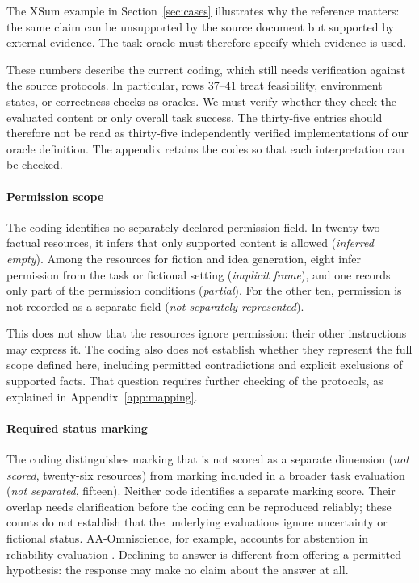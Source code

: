 \documentclass{clv2025}
\begin{document}
The XSum example in Section~\ref{sec:cases} illustrates why the reference
matters: the same claim can be unsupported by the source document but
supported by external evidence. The task oracle must therefore specify
which evidence is used.

These numbers describe the current coding, which still needs verification
against the source protocols. In particular, rows 37--41 treat feasibility,
environment states, or correctness checks as oracles. We must verify whether
they check the evaluated content or only overall task success. The
thirty-five entries should therefore not be read as thirty-five independently
verified implementations of our oracle definition. The appendix retains the
codes so that each interpretation can be checked.

\paragraph{Permission scope}
The coding identifies no separately declared permission field. In twenty-two
factual resources, it infers that only supported content is allowed
(\emph{inferred empty}). Among the resources for fiction and idea generation,
eight infer permission from the task or fictional setting
(\emph{implicit frame}), and one records only part of the permission conditions
(\emph{partial}). For the other ten, permission is not recorded as a separate
field (\emph{not separately represented}).

This does not show that the resources ignore permission: their other
instructions may express it. The coding also does not establish whether they
represent the full scope defined here, including permitted contradictions
and explicit exclusions of supported facts. That question requires further
checking of the protocols, as explained in Appendix~\ref{app:mapping}.

\paragraph{Required status marking}
The coding distinguishes marking that is not scored as a separate dimension
(\emph{not scored}, twenty-six resources) from marking included in a broader
task evaluation (\emph{not separated}, fifteen). Neither code identifies a
separate marking score. Their overlap needs clarification before the coding
can be reproduced reliably; these counts do not establish that the underlying
evaluations ignore uncertainty or fictional status.
AA-Omniscience, for example, accounts for abstention in reliability evaluation
\citep{jackson_aaomniscience_2025}. Declining to answer is different from
offering a permitted hypothesis: the response may make no claim about the
answer at all.
\end{document}
